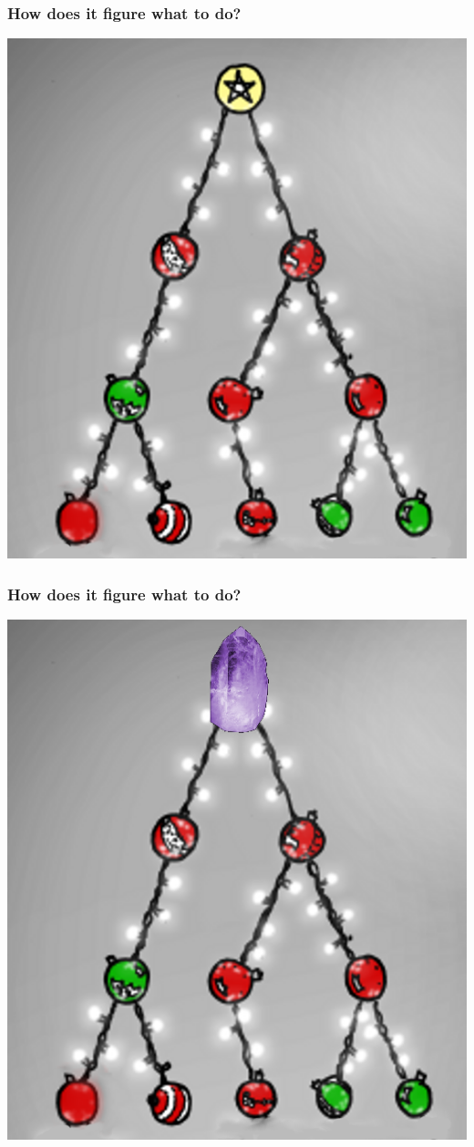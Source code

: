 \documentclass[slides,compress]{beamer}
\begin{document}
\begin{frame}
\frametitle{How does it figure what to do?}
\hspace{4cm}
\includegraphics[scale=0.25]{figures/christmas-tree-nothing.png}
\end{frame}

\begin{frame}
\frametitle{How does it figure what to do?}
\hspace{4cm}
\includegraphics[scale=0.25]{figures/christmas-tree-nothing-crystal.png}
\end{frame}
\end{document}
